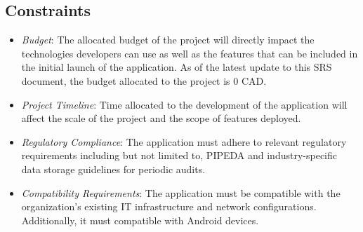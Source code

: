 \documentclass[]{article}
\begin{document}
\subsection{Constraints}
\label{sub:constraints}
\begin{itemize}
	\item \emph{Budget}: The allocated budget of the project will directly impact the technologies developers can use as well as the features that can be included in the initial launch of the application. As of the latest update to this SRS document, the budget allocated to the project is 0 CAD.
 	\item \emph{Project Timeline}: Time allocated to the development of the application will affect the scale of the project and the scope of features deployed.
  	\item \emph{Regulatory Compliance}: The application must adhere to relevant regulatory requirements including but not limited to, PIPEDA and industry-specific data storage guidelines for periodic audits.
   	\item \emph{Compatibility Requirements}: The application must be compatible with the organization's existing IT infrastructure and network configurations. Additionally, it must compatible with Android devices.
\end{itemize}
\end{document}
